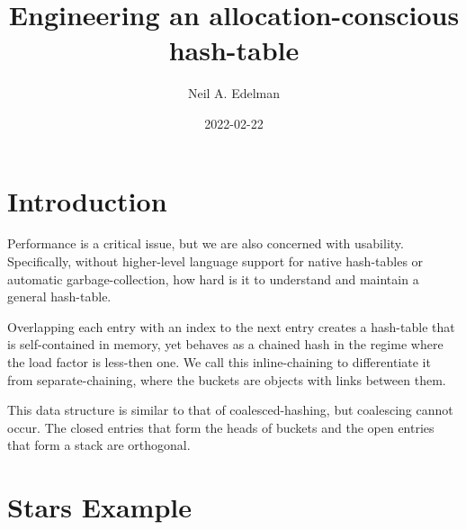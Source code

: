 \documentclass[12pt]{article}
\author{Neil A. Edelman}
\title{Engineering an allocation-conscious hash-table}
\date{2022-02-22}
\begin{document}
\maketitle


\section{Introduction}

Performance is a critical issue, but we are also concerned with usability. Specifically, without higher-level language support for native hash-tables or automatic garbage-collection, how hard is it to understand and maintain a general hash-table.

Overlapping each entry with an index to the next entry creates a hash-table that is self-contained in memory, yet behaves as a chained hash in the regime where the load factor is less-then one.\cite{knuth1998sorting} We call this inline-chaining to differentiate it from separate-chaining, where the buckets are objects with links between them.

This data structure is similar to that of coalesced-hashing\cite{williams1959handling}, but coalescing cannot occur. The closed entries that form the heads of buckets and the open entries that form a stack are orthogonal.

\section{Stars Example}
\end{document}

